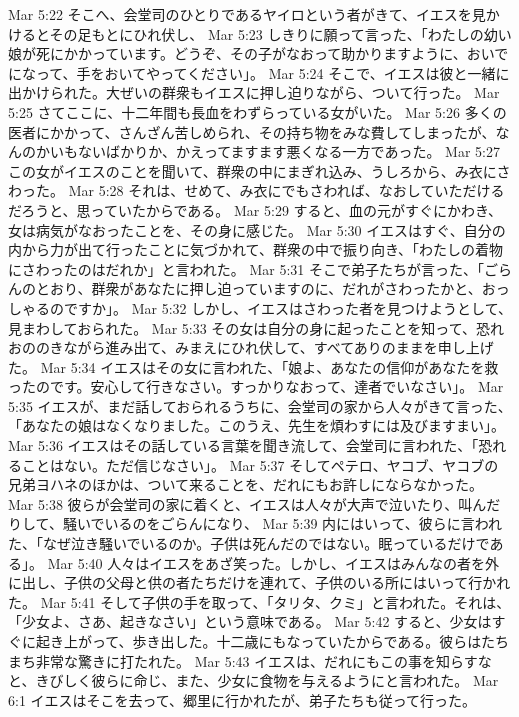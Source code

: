 Mar 5:22  そこへ、会堂司のひとりであるヤイロという者がきて、イエスを見かけるとその足もとにひれ伏し、
Mar 5:23  しきりに願って言った、「わたしの幼い娘が死にかかっています。どうぞ、その子がなおって助かりますように、おいでになって、手をおいてやってください」。
Mar 5:24  そこで、イエスは彼と一緒に出かけられた。大ぜいの群衆もイエスに押し迫りながら、ついて行った。
Mar 5:25  さてここに、十二年間も長血をわずらっている女がいた。
Mar 5:26  多くの医者にかかって、さんざん苦しめられ、その持ち物をみな費してしまったが、なんのかいもないばかりか、かえってますます悪くなる一方であった。
Mar 5:27  この女がイエスのことを聞いて、群衆の中にまぎれ込み、うしろから、み衣にさわった。
Mar 5:28  それは、せめて、み衣にでもさわれば、なおしていただけるだろうと、思っていたからである。
Mar 5:29  すると、血の元がすぐにかわき、女は病気がなおったことを、その身に感じた。
Mar 5:30  イエスはすぐ、自分の内から力が出て行ったことに気づかれて、群衆の中で振り向き、「わたしの着物にさわったのはだれか」と言われた。
Mar 5:31  そこで弟子たちが言った、「ごらんのとおり、群衆があなたに押し迫っていますのに、だれがさわったかと、おっしゃるのですか」。
Mar 5:32  しかし、イエスはさわった者を見つけようとして、見まわしておられた。
Mar 5:33  その女は自分の身に起ったことを知って、恐れおののきながら進み出て、みまえにひれ伏して、すべてありのままを申し上げた。
Mar 5:34  イエスはその女に言われた、「娘よ、あなたの信仰があなたを救ったのです。安心して行きなさい。すっかりなおって、達者でいなさい」。
Mar 5:35  イエスが、まだ話しておられるうちに、会堂司の家から人々がきて言った、「あなたの娘はなくなりました。このうえ、先生を煩わすには及びますまい」。
Mar 5:36  イエスはその話している言葉を聞き流して、会堂司に言われた、「恐れることはない。ただ信じなさい」。
Mar 5:37  そしてペテロ、ヤコブ、ヤコブの兄弟ヨハネのほかは、ついて来ることを、だれにもお許しにならなかった。
Mar 5:38  彼らが会堂司の家に着くと、イエスは人々が大声で泣いたり、叫んだりして、騒いでいるのをごらんになり、
Mar 5:39  内にはいって、彼らに言われた、「なぜ泣き騒いでいるのか。子供は死んだのではない。眠っているだけである」。
Mar 5:40  人々はイエスをあざ笑った。しかし、イエスはみんなの者を外に出し、子供の父母と供の者たちだけを連れて、子供のいる所にはいって行かれた。
Mar 5:41  そして子供の手を取って、「タリタ、クミ」と言われた。それは、「少女よ、さあ、起きなさい」という意味である。
Mar 5:42  すると、少女はすぐに起き上がって、歩き出した。十二歳にもなっていたからである。彼らはたちまち非常な驚きに打たれた。
Mar 5:43  イエスは、だれにもこの事を知らすなと、きびしく彼らに命じ、また、少女に食物を与えるようにと言われた。
Mar 6:1  イエスはそこを去って、郷里に行かれたが、弟子たちも従って行った。
